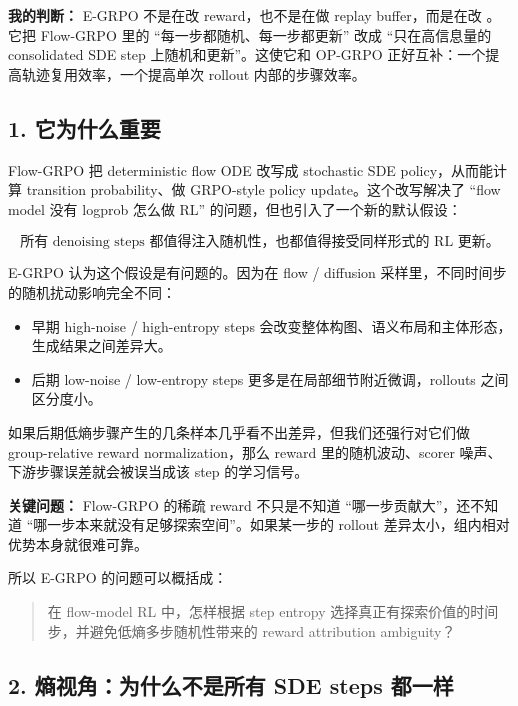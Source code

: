 \begin{summarybox}
\textbf{我的判断：} E-GRPO 不是在改 reward，也不是在做 replay buffer，而是在改 。它把 Flow-GRPO 里的 ``每一步都随机、每一步都更新'' 改成 ``只在高信息量的 consolidated SDE step 上随机和更新''。这使它和 OP-GRPO 正好互补：一个提高轨迹复用效率，一个提高单次 rollout 内部的步骤效率。
\end{summarybox}

\subsection{1. 它为什么重要}

Flow-GRPO 把 deterministic flow ODE 改写成 stochastic SDE policy，从而能计算 transition probability、做 GRPO-style policy update。这个改写解决了 ``flow model 没有 logprob 怎么做 RL'' 的问题，但也引入了一个新的默认假设：

\[
\text{所有 denoising steps 都值得注入随机性，也都值得接受同样形式的 RL 更新。}
\]

E-GRPO 认为这个假设是有问题的。因为在 flow / diffusion 采样里，不同时间步的随机扰动影响完全不同：

\begin{itemize}[leftmargin=1.5em]
  \item 早期 high-noise / high-entropy steps 会改变整体构图、语义布局和主体形态，生成结果之间差异大。
  \item 后期 low-noise / low-entropy steps 更多是在局部细节附近微调，rollouts 之间区分度小。
\end{itemize}

如果后期低熵步骤产生的几条样本几乎看不出差异，但我们还强行对它们做 group-relative reward normalization，那么 reward 里的随机波动、scorer 噪声、下游步骤误差就会被误当成该 step 的学习信号。

\begin{warnbox}
\textbf{关键问题：} Flow-GRPO 的稀疏 reward 不只是不知道 ``哪一步贡献大''，还不知道 ``哪一步本来就没有足够探索空间''。如果某一步的 rollout 差异太小，组内相对优势本身就很难可靠。
\end{warnbox}

所以 E-GRPO 的问题可以概括成：

\begin{quote}
在 flow-model RL 中，怎样根据 step entropy 选择真正有探索价值的时间步，并避免低熵多步随机性带来的 reward attribution ambiguity？
\end{quote}

\subsection{2. 熵视角：为什么不是所有 SDE steps 都一样}

